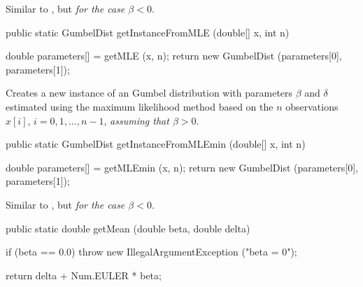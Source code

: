 \begin{tabb}
Similar to , but \emph{for the case $\beta < 0$}.
\end{tabb}
\begin{htmlonly}
\end{htmlonly}
\begin{code}

   public static GumbelDist getInstanceFromMLE (double[] x, int n)\begin{hide} {
      double parameters[] = getMLE (x, n);
      return new GumbelDist (parameters[0], parameters[1]);
   }\end{hide}
\end{code}
\begin{tabb}
   Creates a new instance of an Gumbel distribution with parameters
   $\beta$ and $\delta$ estimated using the maximum likelihood method based
    on the $n$ observations $x[i]$, $i = 0, 1, \ldots, n-1$,  \emph{assuming that $\beta > 0$}.
\end{tabb}
\begin{htmlonly}
\end{htmlonly}
\begin{code}

   public static GumbelDist getInstanceFromMLEmin (double[] x, int n)\begin{hide} {
      double parameters[] = getMLEmin (x, n);
      return new GumbelDist (parameters[0], parameters[1]);
   }\end{hide}
\end{code}
\begin{tabb}
 Similar to , but \emph{for the case $\beta < 0$}.
\end{tabb}
\begin{htmlonly}
\end{htmlonly}
\begin{code}

   public static double getMean (double beta, double delta)\begin{hide} {
     if (beta == 0.0)
         throw new IllegalArgumentException ("beta = 0");

      return delta + Num.EULER * beta;
   }\end{hide}
\end{code}
